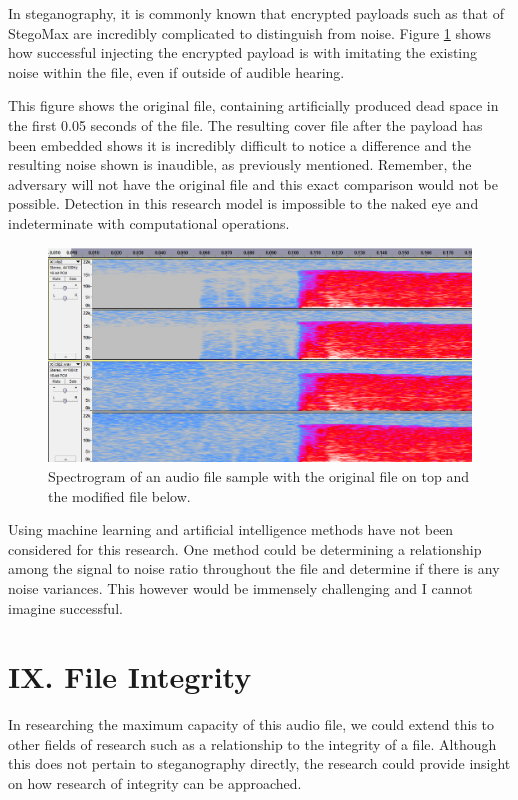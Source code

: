\documentclass[letterpaper]{article}
\begin{document}
In steganography, it is commonly known that encrypted payloads such as that of StegoMax are incredibly complicated to distinguish from noise. Figure \ref{fig:spectrogram} shows how successful injecting the encrypted payload is with imitating the existing noise within the file, even if outside of audible hearing.

This figure shows the original file, containing artificially produced dead space in the first 0.05 seconds of the file. The resulting cover file after the payload has been embedded shows it is incredibly difficult to notice a difference and the resulting noise shown is inaudible, as previously mentioned. Remember, the adversary will not have the original file and this exact comparison would not be possible. Detection in this research model is impossible to the naked eye and indeterminate with computational operations.

\begin{figure}[ht]
	\centering
    \includegraphics[width=15cm]{images/spectrogram.png}
	\caption{Spectrogram of an audio file sample with the original file on top and the modified file below. 
    }
    \label{fig:spectrogram}
\end{figure}

Using machine learning and artificial intelligence methods have not been considered for this research. One method could be determining a relationship among the signal to noise ratio throughout the file and determine if there is any noise variances. This however would be immensely challenging and I cannot imagine successful. 

\section{IX. File Integrity}
In researching the maximum capacity of this audio file, we could extend this to other fields of research such as a relationship to the integrity of a file. Although this does not pertain to steganography directly, the research could provide insight on how research of integrity can be approached.
\end{document}
